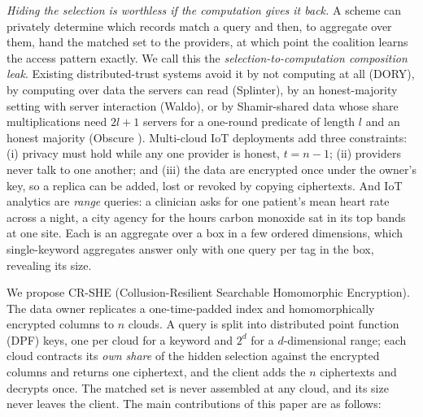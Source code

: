 \emph{Hiding the selection is worthless if the computation gives it back.} A
scheme can privately determine which records match a query and then, to
aggregate over them, hand the matched set to the providers, at which point the
coalition learns the access pattern exactly. We call this the
\emph{selection-to-computation composition leak}. Existing distributed-trust
systems avoid it by not computing at all (DORY), by computing over data the
servers can read (Splinter), by an honest-majority setting with server
interaction (Waldo), or by Shamir-shared data whose share multiplications need
$2l+1$ servers for a one-round predicate of length $l$ and an honest majority
(Obscure \citep{gupta2020obscure}). Multi-cloud IoT deployments add three
constraints: (i) privacy must hold while any one provider is honest, $t=n-1$;
(ii) providers never talk to one another; and (iii) the data are encrypted once
under the owner's key, so a replica can be added, lost or revoked by copying
ciphertexts. And IoT analytics are \emph{range} queries: a clinician asks for
one patient's mean heart rate across a night, a city agency for the hours
carbon monoxide sat in its top bands at one site. Each is an aggregate over a
box in a few ordered dimensions, which single-keyword aggregates answer only
with one query per tag in the box, revealing its size.

We propose CR-SHE (Collusion-Resilient Searchable Homomorphic Encryption). The
data owner replicates a one-time-padded index and homomorphically encrypted
columns to $n$ clouds. A query is split into distributed point function (DPF)
keys, one per cloud for a keyword and $2^d$ for a $d$-dimensional range; each
cloud contracts its \emph{own share} of the hidden selection against the
encrypted columns and returns one ciphertext, and the client adds the $n$
ciphertexts and decrypts once. The matched set is never assembled at any
cloud, and its size never leaves the client. The main contributions of this
paper are as follows:

